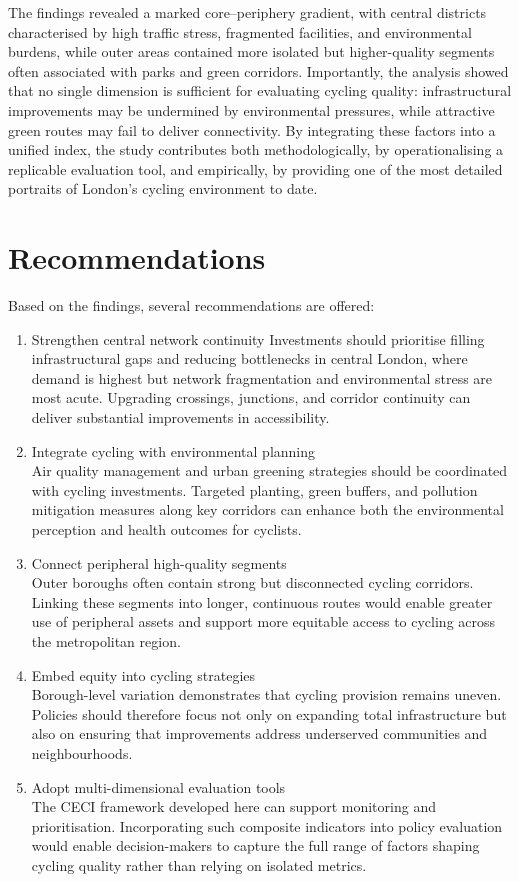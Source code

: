 \documentclass[
  12pt,
  oneside]{book}
\begin{document}
The findings revealed a marked core--periphery gradient, with central districts characterised by high traffic stress, fragmented facilities, and environmental burdens, while outer areas contained more isolated but higher-quality segments often associated with parks and green corridors. Importantly, the analysis showed that no single dimension is sufficient for evaluating cycling quality: infrastructural improvements may be undermined by environmental pressures, while attractive green routes may fail to deliver connectivity. By integrating these factors into a unified index, the study contributes both methodologically, by operationalising a replicable evaluation tool, and empirically, by providing one of the most detailed portraits of London's cycling environment to date.

\section{Recommendations}\label{recommendations}

Based on the findings, several recommendations are offered:

\begin{enumerate}
\def\labelenumi{\arabic{enumi}.}
\item
  Strengthen central network continuity
  Investments should prioritise filling infrastructural gaps and reducing bottlenecks in central London, where demand is highest but network fragmentation and environmental stress are most acute. Upgrading crossings, junctions, and corridor continuity can deliver substantial improvements in accessibility.
\item
  Integrate cycling with environmental planning\\
  Air quality management and urban greening strategies should be coordinated with cycling investments. Targeted planting, green buffers, and pollution mitigation measures along key corridors can enhance both the environmental perception and health outcomes for cyclists.
\item
  Connect peripheral high-quality segments\\
  Outer boroughs often contain strong but disconnected cycling corridors. Linking these segments into longer, continuous routes would enable greater use of peripheral assets and support more equitable access to cycling across the metropolitan region.
\item
  Embed equity into cycling strategies\\
  Borough-level variation demonstrates that cycling provision remains uneven. Policies should therefore focus not only on expanding total infrastructure but also on ensuring that improvements address underserved communities and neighbourhoods.
\item
  Adopt multi-dimensional evaluation tools\\
  The CECI framework developed here can support monitoring and prioritisation. Incorporating such composite indicators into policy evaluation would enable decision-makers to capture the full range of factors shaping cycling quality rather than relying on isolated metrics.
\end{enumerate}
\end{document}
